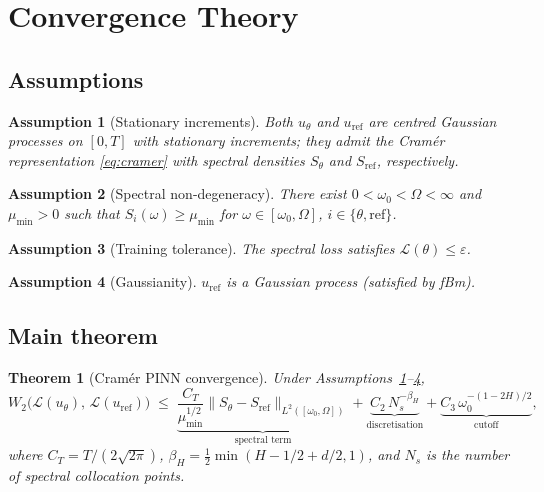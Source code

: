 \documentclass[11pt,a4paper]{article}
\newtheorem{theorem}{Theorem}[section]
\newtheorem{assumption}{Assumption}
\begin{document}
\section{Convergence Theory}
\label{sec:theory}

\subsection{Assumptions}

\begin{assumption}[Stationary increments]\label{ass:si}
 Both $u_\theta$ and $u_{\mathrm{ref}}$ are centred Gaussian processes
 on $[0,T]$ with stationary increments; they admit the Cramér
 representation \eqref{eq:cramer} with spectral densities
 $S_\theta$ and $S_{\mathrm{ref}}$, respectively.
\end{assumption}

\begin{assumption}[Spectral non-degeneracy]\label{ass:nd}
 There exist $0 < \omega_0 < \Omega < \infty$ and $\mu_{\min} > 0$
 such that $S_i(\omega) \geq \mu_{\min}$ for $\omega \in
 [\omega_0,\Omega]$, $i \in \{\theta, \mathrm{ref}\}$.
\end{assumption}

\begin{assumption}[Training tolerance]\label{ass:tol}
 The spectral loss satisfies $\mathcal{L}(\theta) \leq \varepsilon$.
\end{assumption}

\begin{assumption}[Gaussianity]\label{ass:gauss}
 $u_{\mathrm{ref}}$ is a Gaussian process (satisfied by fBm).
\end{assumption}

\subsection{Main theorem}

\begin{theorem}[Cramér PINN convergence]\label{thm:main}
 Under Assumptions~\ref{ass:si}--\ref{ass:gauss},
 \begin{equation}
  W_2\!\bigl(\mathcal{L}(u_\theta),\,\mathcal{L}(u_{\mathrm{ref}})\bigr)
  \;\leq\;
  \underbrace{\frac{C_T}{\mu_{\min}^{1/2}}
  \bigl\|S_\theta - S_{\mathrm{ref}}\bigr\|_{L^2([\omega_0,\Omega])}}_{\text{spectral term}}
  +
  \underbrace{C_2\,N_s^{-\beta_H}}_{\text{discretisation}}
  +
  \underbrace{C_3\,\omega_0^{-(1-2H)/2}}_{\text{cutoff}},
  \label{eq:main-bound}
 \end{equation}
 where $C_T = T/(2\sqrt{2\pi})$, $\beta_H = \frac{1}{2}\min(H - 1/2 + d/2, 1)$,
 and $N_s$ is the number of spectral collocation points.
\end{theorem}
\end{document}
